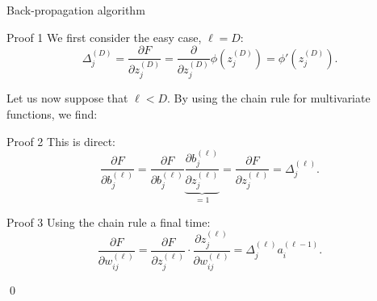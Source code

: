 \documentclass[a4paper]{article}
\begin{document}
\begin{parag}{Back-propagation algorithm}
    \begin{subparag}{Proof 1}
        We first consider the easy case, $\ell = D$: 
        \[\Delta_j^{\left(D\right)} = \frac{\partial F}{\partial z_j^{\left(D\right)}} = \frac{\partial}{\partial z_j^{\left(D\right)}} \phi\left(z_j^{\left(D\right)}\right) = \phi'\left(z_j^{\left(D\right)}\right).\]

        Let us now suppose that $\ell < D$. By using the chain rule for multivariate functions, we find: 
    \end{subparag}
    
    \begin{subparag}{Proof 2}
        This is direct: 
        \[\frac{\partial F}{\partial b_j^{\left(\ell\right)}} = \frac{\partial F}{\partial b_{j}^{\left(\ell\right)}} \underbrace{\frac{\partial b_j^{\left(\ell\right)}}{\partial z_j^{\left(\ell\right)}}}_{= 1} = \frac{\partial F}{\partial z_j^{\left(\ell\right)}} = \Delta_j^{\left(\ell\right)}.\]
    \end{subparag}

    \begin{subparag}{Proof 3}
        Using the chain rule a final time: 
        \[\frac{\partial F}{\partial w_{ij}^{\left(\ell\right)}} = \frac{\partial F}{\partial z_j^{\left(\ell\right)}}\cdot \frac{\partial z_j^{\left(\ell\right)}}{\partial w_{ij}^{\left(\ell\right)}} = \Delta_j^{\left(\ell\right)} a_i^{\left(\ell - 1\right)}.\]
        
        \qed
    \end{subparag}
\end{parag}
\end{document}

